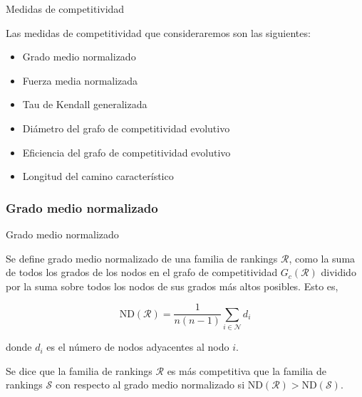 \documentclass[10pt,hyperref={unicode}]{beamer}
\begin{document}
	\begin{frame}{Medidas de competitividad}
	
		Las medidas de competitividad que consideraremos son las siguientes:
	
		\begin{itemize}
		\item Grado medio normalizado
		\item Fuerza media normalizada
		\item Tau de Kendall generalizada
		\item Diámetro del grafo de competitividad evolutivo
		\item Eficiencia del grafo de competitividad evolutivo
		\item Longitud del camino característico
		\end{itemize}
			
	\end{frame}
	
	
	\subsubsection*{Grado medio normalizado}
	
	
	\begin{frame}{Grado medio normalizado}
		\begin{defi}
			Se define grado medio normalizado de una familia de rankings $\mathcal{R}$, como la suma de todos los grados de los nodos en el grafo de competitividad $G_c(\mathcal{R})$ dividido por la suma sobre todos los nodos de sus grados más altos posibles. Esto es,
			
			\begin{equation}
			\mathrm{ND}(\mathcal{R}) = \dfrac{1}{n(n-1)} \sum_{i \in \mathcal{N}} d_i
			\end{equation}
			
			donde $d_i$ es el número de nodos adyacentes al nodo  $i$.
		\end{defi}
		
		\begin{defi}
			Se dice que la familia de rankings $\mathcal{R}$ es más competitiva que la familia de rankings $\mathcal{S}$ con respecto al grado medio normalizado si $\mathrm{ND}(\mathcal{R}) > \mathrm{ND}(\mathcal{S})$.
		\end{defi}
	\end{frame}
	
\end{document}
